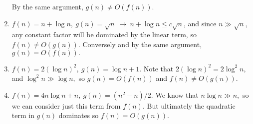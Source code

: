 \documentclass{report}
\begin{document}
\begin{enumerate}[label=(\alph*)]
		By the same argument, $g(n) \ne O(f(n)).$

	\item $f(n) = n + \log n,\ g(n) = \sqrt{n}\ \rightarrow\ n + \log n \le c\sqrt{n}$, and
		since $n \gg \sqrt{n}$, any constant factor will be dominated by the linear term, so
		$f(n) \ne O(g(n)).$ Conversely and by the same argument, $g(n) = O(f(n)).$

	\item $f(n) = 2\left(\log n\right)^2,\ g(n) = \log n + 1.$ Note that
		$2\left(\log n\right)^2 = 2\log^2 n$, and $\log^2 n \gg \log n,$ so $g(n) = O(f(n))$
		and $f(n) \ne O(g(n)).$

	\item $f(n) = 4n\log n + n,\ g(n) = \left(n^2 - n\right)/2.$ We know that
		$n\log n \gg n,$ so we can consider just this term from $f(n).$ But ultimately the
		quadratic term in $g(n)$ dominates so $f(n) = O(g(n)).$
\end{enumerate}
\end{document}
